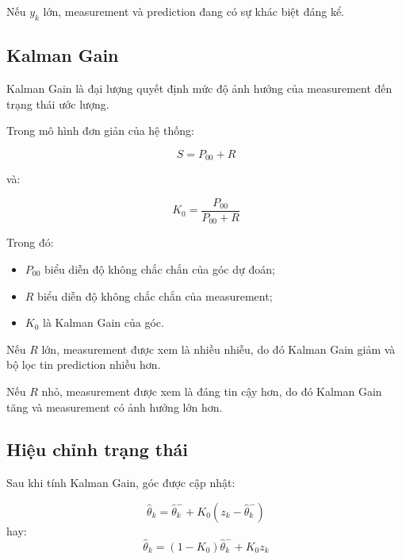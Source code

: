 Nếu $y_k$ lớn, measurement và prediction đang có sự khác biệt đáng kể.


\subsection{Kalman Gain}

Kalman Gain là đại lượng quyết định mức độ ảnh hưởng của measurement đến trạng thái ước lượng.

Trong mô hình đơn giản của hệ thống:

\begin{equation}
S=P_{00}+R
\end{equation}

và:

\begin{equation}
K_0=
\frac{P_{00}}{P_{00}+R}
\end{equation}

Trong đó:

\begin{itemize}
    \item $P_{00}$ biểu diễn độ không chắc chắn của góc dự đoán;
    \item $R$ biểu diễn độ không chắc chắn của measurement;
    \item $K_0$ là Kalman Gain của góc.
\end{itemize}

Nếu $R$ lớn, measurement được xem là nhiều nhiễu, do đó Kalman Gain giảm và bộ lọc tin prediction nhiều hơn.

Nếu $R$ nhỏ, measurement được xem là đáng tin cậy hơn, do đó Kalman Gain tăng và measurement có ảnh hưởng lớn hơn.


\subsection{Hiệu chỉnh trạng thái}

Sau khi tính Kalman Gain, góc được cập nhật:

\begin{equation}
\hat{\theta}_k
=
\hat{\theta}_k^{-}
+
K_0
\left(
z_k-\hat{\theta}_k^{-}
\right)
\end{equation}
hay:
\begin{equation}
\hat{\theta}_k
=
(1-K_0)\hat{\theta}_k^{-}
+
K_0z_k
\end{equation}

